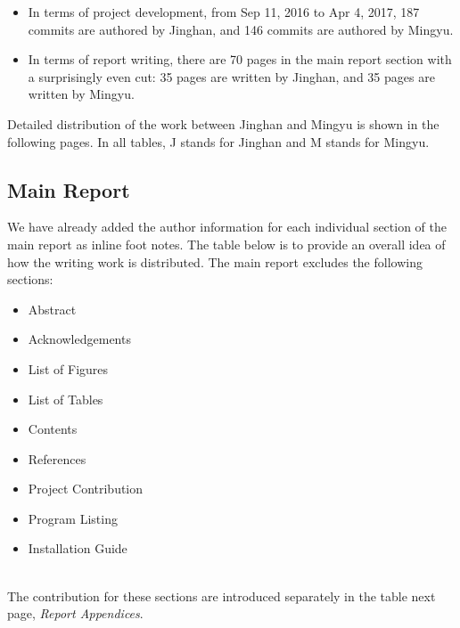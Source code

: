 \documentclass[12pt,a4paper]{article}
\begin{document}
    \begin{itemize}
        \setlength\itemsep{-0.5em}
        \item In terms of project development, from Sep 11, 2016 to Apr 4, 2017, 187 commits are authored by Jinghan, and 146 commits are authored by Mingyu.
        \item In terms of report writing, there are 70 pages in the main report section with a surprisingly even cut: 35 pages are written by Jinghan, and 35 pages are written by Mingyu.
    \end{itemize}
    
    Detailed distribution of the work between Jinghan and Mingyu is shown in the following pages. In all tables, J stands for Jinghan and M stands for Mingyu.
    
    \clearpage
    
    \subsection*{Main Report}
    We have already added the author information for each individual section of the main report as inline foot notes. The table below is to provide an overall idea of how the writing work is distributed. The main report excludes the following sections: 
    
    \begin{multicols}{2}
    \begin{itemize}
        \setlength\itemsep{-0.5em}
        \item Abstract
        \item Acknowledgements
        \item List of Figures
        \item List of Tables
        \item Contents
        \item References
        \item Project Contribution
        \item Program Listing
        \item Installation Guide\\ ~
    \end{itemize}
    \end{multicols}
    
    The contribution for these sections are introduced separately in the table next page, \textit{Report Appendices}.
    
\end{document}
